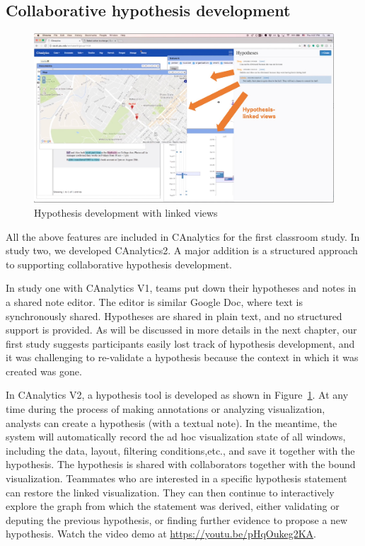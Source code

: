 \subsection{Collaborative hypothesis development}\label{feature-hypothesis}

\begin{figure}
	\centering
	\includegraphics[width=\columnwidth]{03-System/img/hypothesis.jpg}
	\caption{Hypothesis development with linked views \label{fig:hypothesis}}
\end{figure}

All the above features are included in CAnalytics for the first classroom study. In study two, we developed CAnalytics2. A major addition is a structured approach to supporting collaborative hypothesis development. 

In study one with CAnalytics V1, teams put down their hypotheses and notes in a shared note editor. The editor is similar Google Doc, where text is synchronously shared. Hypotheses are shared in plain text, and no structured support is provided. As will be discussed in more details in the next chapter, our first study suggests participants easily lost track of hypothesis development, and it was challenging to re-validate a hypothesis because the context in which it was created was gone. 

In CAnalytics V2, a hypothesis tool is developed as shown in Figure~\ref{fig:hypothesis}. At any time during the process of making annotations or analyzing visualization, analysts can create a hypothesis (with a textual note). In the meantime, the system will automatically record the ad hoc visualization state of all windows, including the data, layout, filtering conditions,etc., and save it together with the hypothesis. The hypothesis is shared with collaborators together with the bound visualization. Teammates who are interested in a specific hypothesis statement can restore the linked visualization. They can then continue to interactively explore the graph from which the statement was derived, either validating or deputing the previous hypothesis, or finding further evidence to propose a new hypothesis. Watch the video demo at  \url{https://youtu.be/pHqOukeg2KA}.